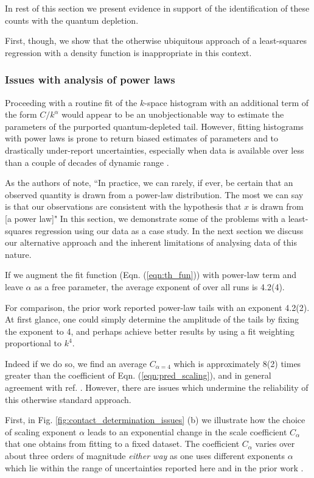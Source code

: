 	In rest of this section we present evidence in support of the identification of these counts with the quantum depletion.
	
	First, though, we show that the otherwise ubiquitous approach of a least-squares regression with a density function is inappropriate in this context.

\subsubsection{Issues with analysis of power laws}	
\label{sec:pow_issues}

	Proceeding with a routine fit of the $k$-space histogram with an additional term of the form $C/k^\alpha$ would appear to be an unobjectionable way to estimate the parameters of the purported quantum-depleted tail.
	However, fitting histograms with power laws is prone to return biased estimates of parameters and to drastically under-report uncertainties, especially when data is available over less than a couple of decades of dynamic range \cite{Clauset09,Virkar14}.
	
	As the authors of \cite{Clauset09} note, ``In practice, we can rarely, if ever, be certain that an observed quantity is drawn from a power-law distribution.
	The most we can say is that our observations are consistent with the hypothesis that $x$ is drawn from [a power law]"
	In this section, we demonstrate some of the problems with a least-squares regression using our data as a case study.
	In the next section we discuss our alternative approach and the inherent limitations of analysing data of this nature.
	
	If we augment the fit function (Eqn.
	(\ref{eqn:th_fun})) with power-law term and leave $\alpha$ as a free parameter, the average exponent of over all runs is 4.2(4).
	
	For comparison, the prior work \cite{Chang16} reported power-law tails with an exponent 4.2(2).
	At first glance, one could simply determine the amplitude of the tails by fixing the exponent to 4, and perhaps achieve better results by using a fit weighting proportional to $k^4$.
	 
	Indeed if we do so, we find an average $C_{\alpha=4}$ which is approximately 8(2) times greater than the coefficient of Eqn.
	(\ref{eqn:pred_scaling}), and in general agreement with ref.
	\cite{Chang16}.
	However, there are issues which undermine the reliability of this otherwise standard approach.

	First, in Fig.
	\ref{fig:contact_determination_issues} (b) we illustrate how the choice of scaling exponent $\alpha$ leads to an exponential change in the scale coefficient $C_\alpha$ that one obtains from fitting to a fixed dataset.
	The coefficient $C_\alpha$ varies over about three orders of magnitude \emph{either way} as one uses different exponents $\alpha$ which lie within the range of uncertainties reported here and in the prior work \cite{Chang16}.
	
